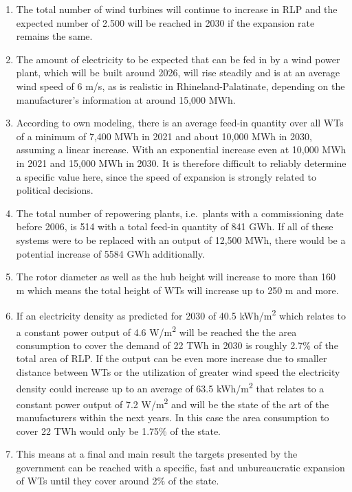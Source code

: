 \documentclass[a4paper,11pt]{article}
\begin{document}
\begin{enumerate}
\def\labelenumi{\arabic{enumi}.}
\item
  The total number of wind turbines will continue to increase in RLP and the expected number of 2.500 will be reached in 2030 if the expansion rate remains the same.
\item
  The amount of electricity to be expected that can be fed in by a wind power plant, which will be built around 2026, will rise steadily and is at an average wind speed of 6 m/s, as is realistic in Rhineland-Palatinate, depending on the manufacturer's information at around 15,000 MWh.
\item
  According to own modeling, there is an average feed-in quantity over all WTs of a minimum of 7,400 MWh in 2021 and about 10,000 MWh in 2030, assuming a linear increase. With an exponential increase even at 10,000 MWh in 2021 and 15,000 MWh in 2030. It is therefore difficult to reliably determine a specific value here, since the speed of expansion is strongly related to political decisions.
\item
  The total number of repowering plants, i.e.~plants with a commissioning date before 2006, is 514 with a total feed-in quantity of 841 GWh. If all of these systems were to be replaced with an output of 12,500 MWh, there would be a potential increase of 5584 GWh additionally.
\item
  The rotor diameter as well as the hub height will increase to more than 160 m which means the total height of WTs will increase up to 250 m and more.
\item
  If an electricity density as predicted for 2030 of 40.5 kWh/m\textsuperscript{2} which relates to a constant power output of 4.6 W/m\textsuperscript{2} will be reached the the area consumption to cover the demand of 22 TWh in 2030 is roughly 2.7\% of the total area of RLP. If the output can be even more increase due to smaller distance between WTs or the utilization of greater wind speed the electricity density could increase up to an average of 63.5 kWh/m\textsuperscript{2} that relates to a constant power output of 7.2 W/m\textsuperscript{2} and will be the state of the art of the manufacturers within the next years. In this case the area consumption to cover 22 TWh would only be 1.75\% of the state.
\item
  This means at a final and main result the targets presented by the government can be reached with a specific, fast and unbureaucratic expansion of WTs until they cover around 2\% of the state.
\end{enumerate}
\end{document}
